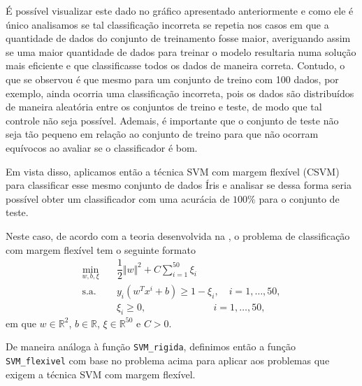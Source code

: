 \documentclass[12pt,a4paper]{scrartcl}
\def\RR{\mathds{R}}
\theoremstyle{definition}%
\begin{document}
É possível visualizar este dado no gráfico apresentado anteriormente e
como ele é único analisamos se tal classificação incorreta se repetia
nos casos em que a quantidade de dados do conjunto de treinamento fosse
maior, averiguando assim se uma maior quantidade de dados para treinar o
modelo resultaria numa solução mais eficiente e que classificasse todos
os dados de maneira correta. Contudo, o que se observou é que mesmo para
um conjunto de treino com 100 dados, por exemplo, ainda ocorria uma
classificação incorreta, pois os dados são distribuídos de maneira
aleatória entre os conjuntos de treino e teste, de modo que tal controle
não seja possível. Ademais, é importante que o conjunto de teste não
seja tão pequeno em relação ao conjunto de treino para que não ocorram
equívocos ao avaliar se o classificador é bom.

Em vista disso, aplicamos então a técnica SVM com margem flexível (CSVM)
para classificar esse mesmo conjunto de dados Íris e analisar se dessa
forma seria possível obter um classificador com uma acurácia de $100\%$
para o conjunto de teste.

Neste caso, de acordo com a teoria desenvolvida na , o
problema de classificação com margem flexível tem o seguinte formato
\begin{align}
\min_{w,b, \xi} & \quad \dfrac{1}{2} \Vert w\Vert^{2} + C\sum_{i=1}^{50} \xi_{i} \\
\text{s.a.} &  \quad y_i(w^{T}x^{i}+b) \geq 1 - \xi_{i} , \quad i=1, \ldots , 50, \\
& \quad \xi_{i} \geq 0 , \ \ \ \ \qquad \qquad \qquad i=1, \ldots , 50, 
\end{align}
em que $w \in \RR^{2}$, $b\in \RR$,
$\xi \in \RR^{50}$ e $C>0$.

De maneira análoga à função \texttt{SVM\_rigida}, definimos então a
função \texttt{SVM\_flexivel} com base no problema acima para aplicar
aos problemas que exigem a técnica SVM com margem flexível.
\end{document}
